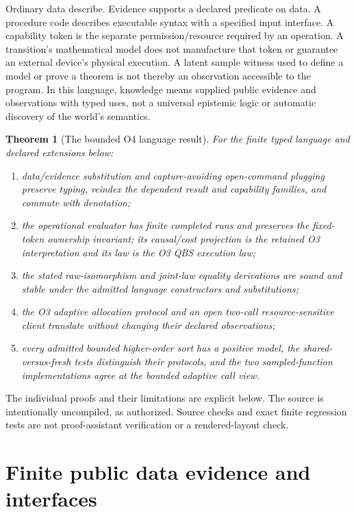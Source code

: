 \documentclass[11pt,a4paper]{article}
\newtheorem{theorem}{Theorem}[section]
\theoremstyle{definition}
\begin{document}
Ordinary data describe. Evidence supports a declared predicate on data.
A procedure code describes executable syntax with a specified input
interface. A capability token is the separate permission/resource required
by an operation. A transition's mathematical model does not manufacture
that token or guarantee an external device's physical execution. A latent
sample witness used to define a model or prove a theorem is not thereby an
observation accessible to the program. In this language, knowledge means
supplied public evidence and observations with typed uses, not a universal
epistemic logic or automatic discovery of the world's semantics.

\begin{theorem}[The bounded O4 language result]\label{thm:main}
For the finite typed language and declared extensions below:
\begin{enumerate}[label=\textup{(\roman*)}]
\item data/evidence substitution and capture-avoiding open-command plugging
preserve typing, reindex the dependent result and capability families,
and commute with denotation;
\item the operational evaluator has finite completed runs and preserves
the fixed-token ownership invariant; its causal/cost projection is the
retained O3 interpretation and its law is the O3 QBS execution law;
\item the stated raw-isomorphism and joint-law equality derivations are
sound and stable under the admitted language constructors and substitutions;
\item the O3 adaptive allocation protocol and an open two-call
resource-sensitive client translate without changing their declared
observations;
\item every admitted bounded higher-order sort has a positive model,
the shared-versus-fresh tests distinguish their protocols, and the two
sampled-function implementations agree at the bounded adaptive call view.
\end{enumerate}
\end{theorem}
The individual proofs and their limitations are explicit below. The
source is intentionally uncompiled, as authorized. Source checks and
exact finite regression tests are not proof-assistant verification or a
rendered-layout check.
\section{Finite public data evidence and interfaces}\label{sec:data}
\end{document}
